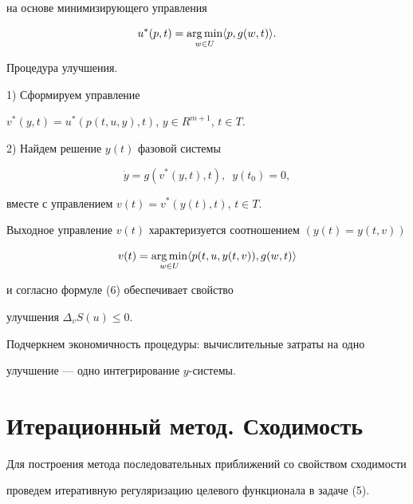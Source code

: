 на основе минимизирующего управления


$$


u^{*}(p,t)=\argmin_{w\in U}\langle p,g(w,t)\rangle.


$$





Процедура улучшения.





1) Сформируем управление


$v^{*}(y,t)=u^{*}(p(t,u,y),t)$, $y\in R^{m+1}$, $t\in T$.





2) Найдем решение $y(t)$ фазовой системы 


$$


\Dot{y}=g(v^{*}(y,t),t),\ \;y(t_{0})=0,


$$


вместе с управлением $v(t)=v^{*}(y(t),t)$, $t\in T$.





Выходное управление $v(t)$ характеризуется соотношением $(y(t)=y(t,v))$


$$


v(t)=\argmin_{w\in U}\langle p(t,u,y(t,v)),g(w,t)\rangle


$$


и согласно формуле (6) обеспечивает свойство


улучшения $\Delta_{v}S(u)\leq 0$.





Подчеркнем экономичность процедуры: вычислительные затраты на одно 


улучшение --- одно интегрирование $y$-системы.





\section{Итерационный метод. Сходимость}





Для построения метода последовательных приближений со свойством сходимости


проведем итеративную регуляризацию целевого функционала в задаче (5).





